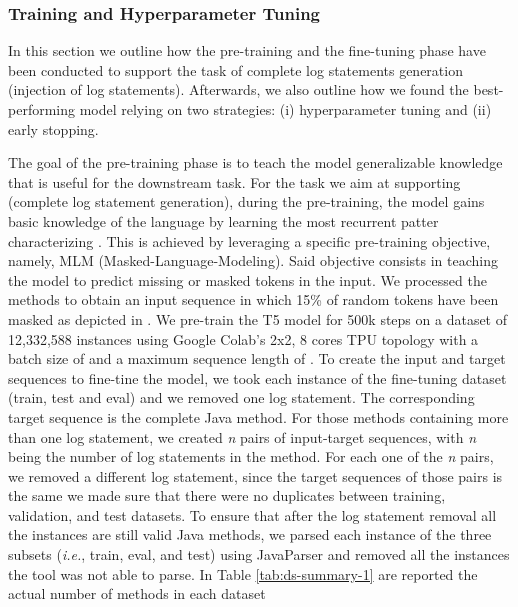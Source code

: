 \subsubsection{Training and Hyperparameter Tuning} \label{sec:training}
In this section we outline how the pre-training and the fine-tuning phase have been conducted to support the task of complete log statements generation (\ie injection of log statements). Afterwards, we also outline how we found the best-performing model relying on two strategies: (i) hyperparameter tuning  and (ii) early stopping.

The goal of the pre-training phase is to teach the model generalizable knowledge that is useful for the downstream task. For the task we aim at supporting (\ie complete log statement generation), during the pre-training, the model gains basic knowledge of the \java language by learning the most recurrent patter characterizing \java. This is achieved by leveraging a specific pre-training objective, namely, MLM (Masked-Language-Modeling). Said objective consists in teaching the model to predict missing or masked tokens in the input. We processed the methods to obtain an input sequence in which 15\% of random tokens have been masked as depicted in .
We pre-train the T5 model for 500k steps on a dataset of 12,332,588 instances using Google Colab's 2x2, 8 cores TPU topology with a batch size of  and a maximum sequence length of . 
To create the input and target sequences to fine-tine the model, we took each instance of the fine-tuning dataset (\ie train, test and eval) and we removed one log statement. The corresponding target sequence is the complete Java method.
For those methods containing more than one log statement, we created \emph{n} pairs of input-target sequences, with \emph{n} being the number of log statements in the method.
For each one of the \emph{n} pairs, we removed a different log statement, since the target sequences of those pairs is the same we made sure that there were no duplicates between training, validation, and test datasets. 
To ensure that after the log statement removal all the instances are still valid Java methods, we parsed each instance of the three subsets (\emph{i.e.}, train, eval, and test) using JavaParser \cite{javaparser} and removed all the instances the tool was not able to parse.
In Table \ref{tab:ds-summary-1} are reported the actual number of methods in each dataset



